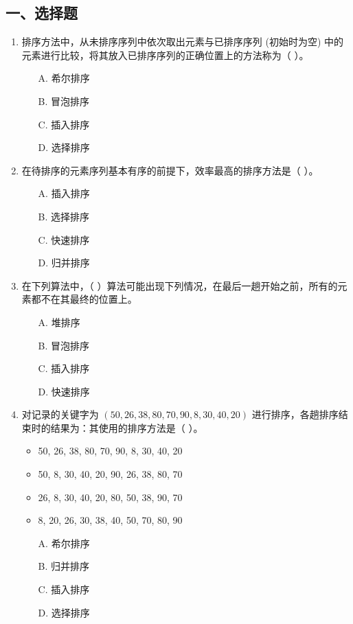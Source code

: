 \documentclass[12pt, a4paper]{article}
\begin{document}
\subsection*{一、选择题}
\begin{enumerate}
    \item 排序方法中，从未排序序列中依次取出元素与已排序序列 (初始时为空) 中的元素进行比较，将其放入已排序序列的正确位置上的方法称为（ ）。
    \begin{enumerate}
        \item[A.] 希尔排序
        \item[B.] 冒泡排序
        \item[C.] 插入排序
        \item[D.] 选择排序
    \end{enumerate}
    
    \item 在待排序的元素序列基本有序的前提下，效率最高的排序方法是（ ）。
    \begin{enumerate}
        \item[A.] 插入排序
        \item[B.] 选择排序
        \item[C.] 快速排序
        \item[D.] 归并排序
    \end{enumerate}
    
    \item 在下列算法中，（ ）算法可能出现下列情况，在最后一趟开始之前，所有的元素都不在其最终的位置上。
    \begin{enumerate}
        \item[A.] 堆排序
        \item[B.] 冒泡排序
        \item[C.] 插入排序
        \item[D.] 快速排序
    \end{enumerate}
    
    \item 对记录的关键字为 $(50, 26, 38, 80, 70, 90, 8, 30, 40, 20)$ 进行排序，各趟排序结束时的结果为：其使用的排序方法是（ ）。
    \begin{itemize}
        \item 50, 26, 38, 80, 70, 90, 8, 30, 40, 20
        \item 50, 8, 30, 40, 20, 90, 26, 38, 80, 70
        \item 26, 8, 30, 40, 20, 80, 50, 38, 90, 70
        \item 8, 20, 26, 30, 38, 40, 50, 70, 80, 90
    \end{itemize}
    \begin{enumerate}
        \item[A.] 希尔排序
        \item[B.] 归并排序
        \item[C.] 插入排序
        \item[D.] 选择排序
    \end{enumerate}
    

\end{enumerate}
\end{document}
